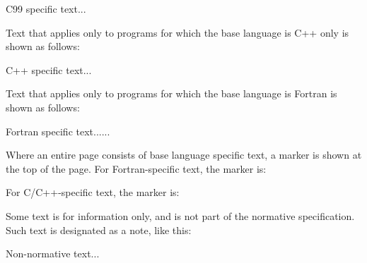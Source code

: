 \begin{c99specific}
C99 specific text...
\end{c99specific}

Text that applies only to programs for which the base language is C++ only is shown as 
follows:

\begin{cppspecific}
C++ specific text...
\end{cppspecific}

Text that applies only to programs for which the base language is Fortran is shown as follows: 

\begin{fortranspecific}
Fortran specific text......
\end{fortranspecific}

Where an entire page consists of base language specific text, a marker is shown
at the top of the page.  For Fortran-specific text, the marker is:

\bigskip
{}
\bigskip

For C/C++-specific text, the marker is:

\bigskip
{}
\bigskip

Some text is for information only, and is not part of the normative specification. Such 
text is designated as a note, like this: 

\begin{note}
Non-normative text...
\end{note}

